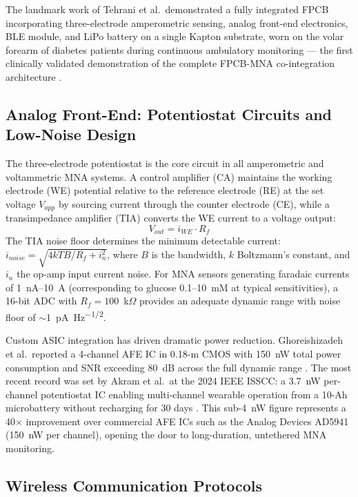 \documentclass[review,1p]{elsarticle}
\begin{document}
The landmark work of Tehrani et al.\ demonstrated a fully integrated FPCB incorporating three-electrode amperometric sensing, analog front-end electronics, BLE module, and LiPo battery on a single Kapton substrate, worn on the volar forearm of diabetes patients during continuous ambulatory monitoring — the first clinically validated demonstration of the complete FPCB-MNA co-integration architecture \cite{Tehrani2022NatBiomedEng}.

\subsection{Analog Front-End: Potentiostat Circuits and Low-Noise Design}
\label{subsec:afe}

The three-electrode potentiostat is the core circuit in all amperometric and voltammetric MNA systems. A control amplifier (CA) maintains the working electrode (WE) potential relative to the reference electrode (RE) at the set voltage $V_{app}$ by sourcing current through the counter electrode (CE), while a transimpedance amplifier (TIA) converts the WE current to a voltage output:
\begin{equation}
V_{out} = i_{WE} \cdot R_f
\label{eq:tia}
\end{equation}
The TIA noise floor determines the minimum detectable current: $i_{noise} = \sqrt{4kTB/R_f + i_n^2}$, where $B$ is the bandwidth, $k$ Boltzmann's constant, and $i_n$ the op-amp input current noise. For MNA sensors generating faradaic currents of 1~nA--10~\textmu{}A (corresponding to glucose 0.1--10~mM at typical sensitivities), a 16-bit ADC with $R_f = 100$~k$\Omega$ provides an adequate dynamic range with noise floor of $\sim$1~pA~Hz\textsuperscript{$-1/2$}.

Custom ASIC integration has driven dramatic power reduction. Ghoreishizadeh et al.\ reported a 4-channel AFE IC in 0.18-\textmu{}m CMOS with 150~nW total power consumption and SNR exceeding 80~dB across the full dynamic range \cite{Ghoreishizadeh2021AFE}. The most recent record was set by Akram et al.\ at the 2024 IEEE ISSCC: a 3.7~nW per-channel potentiostat IC enabling multi-channel wearable operation from a 10-\textmu{}Ah microbattery without recharging for 30 days \cite{Akram2024ISSCC}. This sub-4~nW figure represents a 40$\times$ improvement over commercial AFE ICs such as the Analog Devices AD5941 (150~nW per channel), opening the door to long-duration, untethered MNA monitoring.

\subsection{Wireless Communication Protocols}
\label{subsec:wireless}
\end{document}
